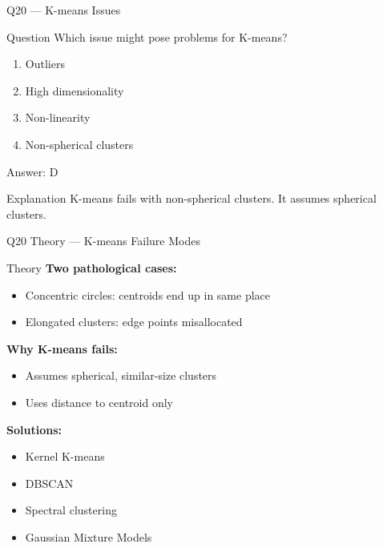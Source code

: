 \documentclass[aspectratio=169,8pt]{beamer}
\begin{document}
	\begin{frame}{Q20 --- K-means Issues}
		\begin{block}{Question}
			Which issue might pose problems for K-means?
		\end{block}
		\begin{enumerate}[label=\Alph*.]
			\item Outliers
			\item High dimensionality
			\item Non-linearity
			\item Non-spherical clusters
		\end{enumerate}
		\begin{exampleblock}{Answer: D}
		\end{exampleblock}
		\begin{block}{Explanation}
			K-means fails with non-spherical clusters. It assumes spherical clusters.
		\end{block}
	\end{frame}
	
	\begin{frame}{Q20 Theory --- K-means Failure Modes}
		\begin{block}{Theory}
			\textbf{Two pathological cases:}
			\begin{itemize}
				\item Concentric circles: centroids end up in same place
				\item Elongated clusters: edge points misallocated
			\end{itemize}
			\textbf{Why K-means fails:}
			\begin{itemize}
				\item Assumes spherical, similar-size clusters
				\item Uses distance to centroid only
			\end{itemize}
			\textbf{Solutions:}
			\begin{itemize}
				\item Kernel K-means
				\item DBSCAN
				\item Spectral clustering
				\item Gaussian Mixture Models
			\end{itemize}
		\end{block}
	\end{frame}
	
\end{document}
